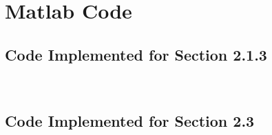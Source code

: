 \section{Matlab Code}
\subsection{Code Implemented for Section 2.1.3}

\

\clearpage

\clearpage
\subsection{Code Implemented for Section 2.3}

\clearpage

\

\clearpage

\
